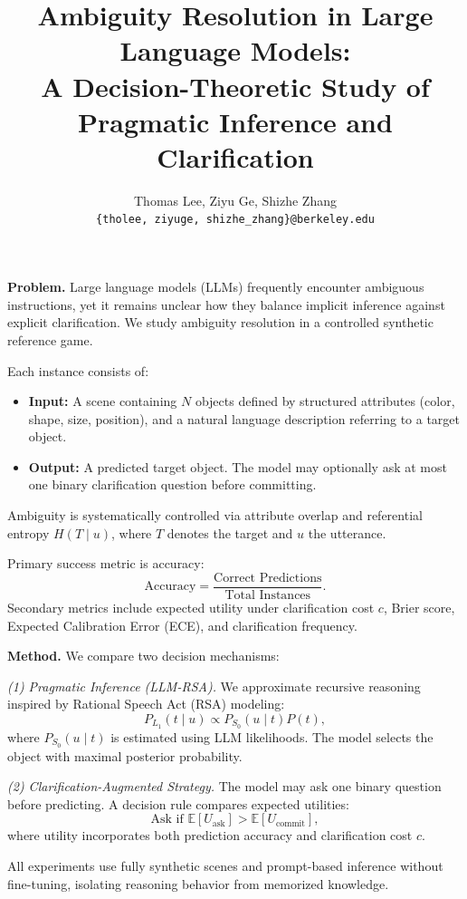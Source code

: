 \documentclass[10pt]{article}
\title{Ambiguity Resolution in Large Language Models:\\
A Decision-Theoretic Study of Pragmatic Inference and Clarification}
\author{
Thomas Lee, Ziyu Ge, Shizhe Zhang \\
\texttt{\{tholee, ziyuge, shizhe\_zhang\}@berkeley.edu}
}
\date{}
\begin{document}
\maketitle

\noindent
\textbf{Problem.}
Large language models (LLMs) frequently encounter ambiguous instructions, yet it remains unclear how they balance implicit inference against explicit clarification. We study ambiguity resolution in a controlled synthetic reference game.

Each instance consists of:
\begin{itemize}
    \item \textbf{Input:} A scene containing $N$ objects defined by structured attributes (color, shape, size, position), and a natural language description referring to a target object.
    \item \textbf{Output:} A predicted target object. The model may optionally ask at most one binary clarification question before committing.
\end{itemize}

Ambiguity is systematically controlled via attribute overlap and referential entropy $H(T \mid u)$, where $T$ denotes the target and $u$ the utterance.

Primary success metric is accuracy:
\[
\text{Accuracy} = \frac{\text{Correct Predictions}}{\text{Total Instances}}.
\]
Secondary metrics include expected utility under clarification cost $c$, Brier score, Expected Calibration Error (ECE), and clarification frequency.

\vspace{0.5em}
\noindent
\textbf{Method.}
We compare two decision mechanisms:

\textit{(1) Pragmatic Inference (LLM-RSA).}  
We approximate recursive reasoning inspired by Rational Speech Act (RSA) modeling:
\[
P_{L_1}(t \mid u) \propto P_{S_0}(u \mid t) P(t),
\]
where $P_{S_0}(u \mid t)$ is estimated using LLM likelihoods. The model selects the object with maximal posterior probability.

\textit{(2) Clarification-Augmented Strategy.}  
The model may ask one binary question before predicting. A decision rule compares expected utilities:
\[
\text{Ask if } \mathbb{E}[U_{\text{ask}}] > \mathbb{E}[U_{\text{commit}}],
\]
where utility incorporates both prediction accuracy and clarification cost $c$.

All experiments use fully synthetic scenes and prompt-based inference without fine-tuning, isolating reasoning behavior from memorized knowledge.
\end{document}
